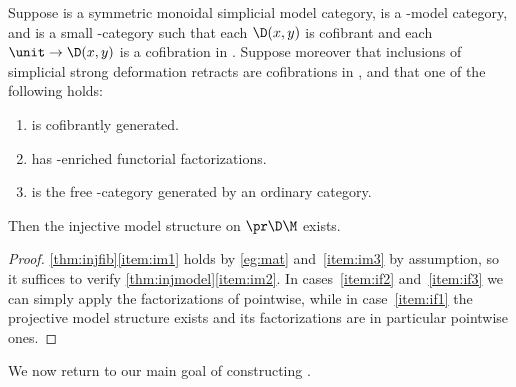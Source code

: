 \begin{cor}\label{thm:injfunctor}
  Suppose \V is a symmetric monoidal simplicial model category, \M is a \V-model category, and \D is a small \V-category such that each $\D(x,y)$ is cofibrant and each $\unit \to \D(x,y)$ is a cofibration in \V.
  Suppose moreover that inclusions of simplicial strong deformation retracts are cofibrations in \M, and that one of the following holds:
  \begin{enumerate}[label=(\alph*)]
  \item \M is cofibrantly generated.\label{item:if1}
  \item \M has \V-enriched functorial factorizations.\label{item:if2}
  \item \D is the free \V-category generated by an ordinary category.\label{item:if3}
  \end{enumerate}
  Then the injective model structure on $\pr\D\M$ exists.
\end{cor}
\begin{proof}
  \cref{thm:injfib}\ref{item:im1} holds by \cref{eg:mat} and~\ref{item:im3} by assumption, so it suffices to verify \cref{thm:injmodel}\ref{item:im2}.
  In cases~\ref{item:if2} and~\ref{item:if3} we can simply apply the factorizations of \M pointwise, while in case~\ref{item:if1} the projective model structure exists and its factorizations are in particular pointwise ones.
\end{proof}

We now return to our main goal of constructing \ttmts.

